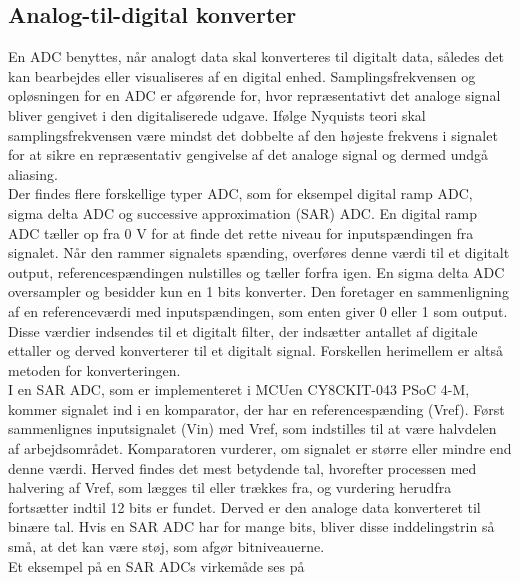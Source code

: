 \subsection{Analog-til-digital konverter}
En ADC benyttes, når analogt data skal konverteres til digitalt data, således det kan bearbejdes eller visualiseres af en digital enhed. Samplingsfrekvensen og opløsningen for en ADC er afgørende for, hvor repræsentativt det analoge signal bliver gengivet i den digitaliserede udgave. Ifølge Nyquists teori skal samplingsfrekvensen være mindst det dobbelte af den højeste frekvens i signalet for at sikre en repræsentativ gengivelse af det analoge signal og dermed undgå aliasing.~\citep{Webster2011} \\
Der findes flere forskellige typer ADC, som for eksempel digital ramp ADC, sigma delta ADC og successive approximation (SAR) ADC. En digital ramp ADC tæller op fra 0 V for at finde det rette niveau for inputspændingen fra signalet. Når den rammer signalets spænding, overføres denne værdi til et digitalt output, referencespændingen nulstilles og tæller forfra igen. En sigma delta ADC oversampler og besidder kun en 1 bits konverter. Den foretager en sammenligning af en referenceværdi med inputspændingen, som enten giver 0 eller 1 som output. Disse værdier indsendes til et digitalt filter, der indsætter antallet af digitale ettaller og derved konverterer til et digitalt signal. Forskellen herimellem er altså metoden for konverteringen.~\citep{Moore2004,Sheingold2014} \\
I en SAR ADC, som er implementeret i MCUen CY8CKIT-043 PSoC 4-M, kommer signalet ind i en komparator, der har en referencespænding (Vref). Først sammenlignes inputsignalet (Vin) med Vref, som indstilles til at være halvdelen af arbejdsområdet. Komparatoren vurderer, om signalet er større eller mindre end denne værdi. Herved findes det mest betydende tal, hvorefter processen med halvering af Vref, som lægges til eller trækkes fra, og vurdering herudfra fortsætter indtil 12 bits er fundet. Derved er den analoge data konverteret til binære tal. Hvis en SAR ADC har for mange bits, bliver disse inddelingstrin så små, at det kan være støj, som afgør bitniveauerne.~\citep{Moore2004,Sheingold2014} \\
Et eksempel på en SAR ADCs virkemåde ses på 
